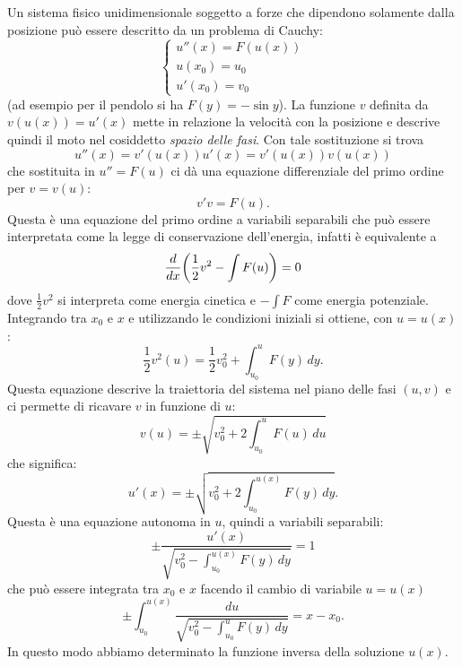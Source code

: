 \begin{example}
%
%
Un sistema fisico unidimensionale soggetto a forze che dipendono solamente
dalla posizione può essere descritto da un problema di Cauchy:
\[
\begin{cases}
  u''(x) = F(u(x)) \\
  u(x_0) = u_0 \\
  u'(x_0) = v_0
\end{cases}
\]
(ad esempio per il pendolo si ha $F(y) = -\sin y$).
La funzione $v$ definita da $v(u(x)) = u'(x)$ mette in relazione
la velocità con la posizione e descrive quindi il moto nel
cosiddetto \emph{spazio delle fasi}. Con tale sostituzione si
trova
\[
  u''(x) = v'(u(x)) u'(x) = v'(u(x)) v(u(x))
\]
che sostituita in $u'' = F(u)$ ci dà una equazione
differenziale del primo ordine per $v=v(u)$:
\[
 v' v  = F(u).
\]
Questa è una equazione del primo ordine a variabili separabili
che può essere interpretata come la legge di conservazione dell'energia,
infatti è equivalente a
\[
  \frac{d}{dx}{\left( \frac 1 2 v^2 - \int F(u) \right)} = 0
\]
dove $\frac 1 2 v^2$ si interpreta come energia cinetica e $-\int F$
come energia potenziale.
Integrando tra $x_0$ e $x$ e utilizzando le condizioni iniziali si ottiene,
con $u=u(x)$:
\[
  \frac 1 2 v^2(u) = \frac 1 2 v_0^2 + \int_{u_0}^{u} F(y)\, dy.
\]
Questa equazione descrive la traiettoria del sistema nel piano delle fasi $(u,v)$
e ci permette di ricavare $v$ in funzione di $u$:
\[
  v(u) = \pm\sqrt{v_0^2 + 2\int_{u_0}^u F(u)\, du}
\]
che significa:
\begin{equation}\label{eq:8844475}
  u'(x) = \pm \sqrt{v_0^2 + 2 \int_{u_0}^{u(x)} F(y)\, dy}.
\end{equation}
Questa è una equazione autonoma in $u$, quindi a variabili separabili:
\[
  \pm\frac{u'(x)}{\sqrt{v_0^2 - \int_{u_0}^{u(x)} F(y)\, dy}} = 1
\]
che può essere integrata tra $x_0$ e $x$ facendo il cambio di variabile $u=u(x)$
\[
  \pm\int_{u_0}^{u(x)} \frac{du}{\sqrt{v_0^2-\int_{u_0}^u F(y)\, dy}} = x-x_0.
\]
In questo modo abbiamo determinato la funzione inversa della soluzione $u(x)$.
\end{example}

